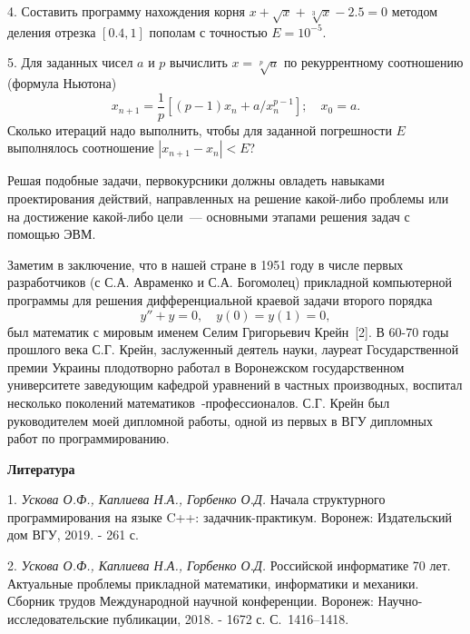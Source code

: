 4. Составить программу нахождения корня $x+\sqrt{x}+\sqrt[3]{x}-2.5=0$ методом деления отрезка $[0.4, 1]$ пополам с точностью
$E=10^{-5}$.

5. Для заданных чисел $a$ и $p$ вычислить $x=\sqrt[p]{a}$ по рекуррентному соотношению (формула Ньютона)
$$
x_{n+1}=\frac{1}{p}[(p-1)x_n+a/x_n^{p-1}]; \quad x_0=a.
$$
Сколько итераций надо выполнить, чтобы для заданной погрешности $E$ выполнялось соотношение $|x_{n+1}-x_n|<E$?

Решая подобные задачи, первокурсники должны овладеть навыками проектирования действий, направленных на решение какой-либо
проблемы или на достижение какой-либо цели~--- основными этапами решения задач с помощью ЭВМ.

Заметим в заключение, что в нашей стране в 1951 году в числе первых разработчиков (с С.А. Авраменко и С.А. Богомолец)
прикладной компьютерной программы для решения дифференциальной краевой задачи второго порядка
$$
y''+y=0, \quad y(0)=y(1)=0,
$$
был математик с мировым именем Селим Григорьевич \linebreak Крейн~[2]. В 60-70 годы прошлого века С.Г. Крейн, заслуженный деятель
науки, лауреат Государственной премии \linebreak Украины плодотворно работал в Воронежском государственном университете заведующим кафедрой
уравнений в частных производных, воспитал несколько поколений математиков~-профессионалов. С.Г. Крейн был руководителем
моей дипломной работы, одной из первых в ВГУ дипломных работ по программированию.

\smallskip \centerline {\bf Литература} \nopagebreak

1. {\it Ускова О.Ф., Каплиева Н.А., Горбенко О.Д.} Начала структурного программирования на языке C++: задачник-практикум.
Воронеж: Издательский дом ВГУ, 2019. - 261 с.

2. {\it Ускова О.Ф., Каплиева Н.А., Горбенко О.Д.} Российской информатике 70 лет. Актуальные проблемы прикладной математики,
информатики и механики. Сборник трудов Международной научной конференции.
Воронеж: Научно-исследовательские публикации, 2018. - 1672 с. С.~1416--1418.

